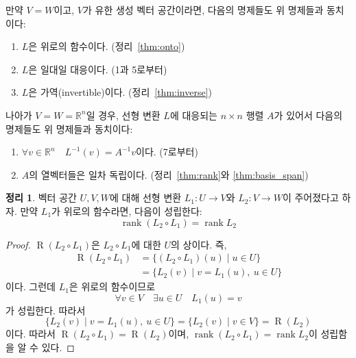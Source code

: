 \documentclass[unfonts,oneside,a4paper]{oblivoir}
\makeatletter
\theoremstyle{definition}
\theoremstyle{theorem}
\newtheorem{theorem}{정리}
\theoremstyle{remark}
\theoremstyle{remark}
\theoremstyle{remark}
\theoremstyle{remark}
\renewcommand{\vec}[1]{\bm{\mathit{#1}}}
\DeclareMathOperator{\Range}{R}
\DeclareMathOperator{\rank}{rank}
\newcommand\nextitem[1]{%
    \setcounter{\@enumctr}{#1}%
    \addtocounter{\@enumctr}{-1}%
}
\makeatother
\begin{document}
만약 $V = W$이고, $V$가 유한 생성 벡터 공간이라면, 다음의 명제들도 위 명제들과 동치이다:
\begin{enumerate}
    \nextitem{5}
    \item $L$은 위로의 함수이다. (정리~\ref{thm:onto})
    \item $L$은 일대일 대응이다. (1과 5로부터)
    \item $L$은 가역(invertible)이다. (정리~\ref{thm:inverse})
\end{enumerate}

나아가 $V = W = \mathbb R^n$일 경우, 선형 변환 $L$에 대응되는 $n \times n$ 행렬 $A$가 있어서 다음의 명제들도 위 명제들과 동치이다:
\begin{enumerate}
    \nextitem{8}
    \item $\forall \vec v \in \mathbb R^n \quad L^{-1}(\vec v) = A^{-1} \vec v$이다. (7로부터)
    \item $A$의 열벡터들은 일차 독립이다. (정리~\ref{thm:rank}와 \ref{thm:basis_span})
\end{enumerate}

\begin{theorem}
    벡터 공간 $U, V, W$에 대해 선형 변환 $L_1: U \rightarrow V$와 $L_2: V \rightarrow W$이 주어졌다고 하자.
    만약 $L_1$가 위로의 함수라면, 다음이 성립한다:
    \begin{equation*}
        \rank (L_2 \circ L_1) = \rank L_2
    \end{equation*}
\end{theorem}

\begin{proof}
    $\Range(L_2 \circ L_1)$은 $L_2 \circ L_1$에 대한 $U$의 상이다.
    즉,
    \begin{align*}
        \Range(L_2 \circ L_1) &= \{(L_2 \circ L_1)(\vec u) \mid \vec u \in U\}\\
                        &= \{L_2(\vec v) \mid \vec v = L_1(\vec u),\ \vec u \in U\}
    \end{align*}
    이다.
    그런데 $L_1$은 위로의 함수이므로
    \begin{equation*}
        \forall \vec v \in V \quad \exists \vec u \in U \quad L_1(\vec u) = \vec v
    \end{equation*}
    가 성립한다.
    따라서
    \begin{equation*}
        \{L_2(\vec v) \mid \vec v = L_1(\vec u),\ \vec u \in U\} = \{L_2(\vec v) \mid \vec v \in V\} = \Range(L_2)
    \end{equation*}
    이다.
    따라서 $\Range(L_2 \circ L_1) = \Range(L_2)$이며, $\rank(L_2 \circ L_1) = \rank L_2$이 성립함을 알 수 있다.
\end{proof}
\end{document}
